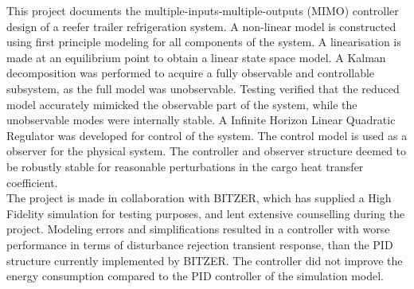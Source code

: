 \abstract
This project documents the multiple-inputs-multiple-outputs (MIMO) controller design of a reefer trailer refrigeration system. A non-linear model is constructed using first principle modeling for all components of the system. A linearisation is made at an equilibrium point to obtain a linear state space model. A Kalman decomposition was performed to acquire a fully observable and controllable subsystem, as the full model was unobservable. Testing verified that the reduced model accurately mimicked the observable part of the system, while the unobservable modes were internally stable. A Infinite Horizon Linear Quadratic Regulator was developed for control of the system. The control model is used as a observer for the physical system. The controller and observer structure deemed to be robustly stable for reasonable perturbations in the cargo heat transfer coefficient.\\
The project is made in collaboration with BITZER, which has supplied a High Fidelity simulation for testing purposes, and lent extensive counselling during the project. Modeling errors and simplifications resulted in a controller with worse performance in terms of disturbance rejection transient response, than the PID structure currently implemented by BITZER. The controller did not improve the energy consumption compared to the PID controller of the simulation model.